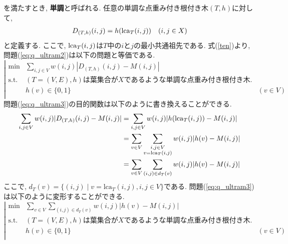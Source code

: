 \documentclass[a4paper,dvipdfmx]{jsarticle}
\begin{document}
を満たすとき, {\bf 単調}と呼ばれる. 任意の単調な点重み付き根付き木$(T,h)$に対して, 
\begin{align}
  D_{(T,h)}(i, j) = h({\rm lca}_T(i, j))\quad (i, j \in X) \label{ten}
\end{align}
と定義する. ここで, ${\rm lca}_T(i, j)$は$T$中の$i$と$j$の最小共通祖先である. 式(\ref{ten})より, 問題(\ref{eq:q_ultram2})は以下の問題と等価である. 
\begin{equation}\label{eq:q_ultram3}
\left|\begin{array}{rll}
\min & \displaystyle\sum_{i, j \in V} w(i,j)|D_{(T, h)}(i,j)- M(i,j)| & \\
\mbox{s.t.} &(T = (V, E),h)は葉集合がXであるような単調な点重み付き根付き木. & \\
& h(v) \in \{0,1\} &(v \in V) \\
\end{array}
\right.
\end{equation}
問題(\ref{eq:q_ultram3})の目的関数は以下のように書き換えることができる. 
\begin{align*}
  \sum_{i, j \in V} w(i,j)|D_{(T, h)}(i,j)- M(i,j)| &=  \sum_{i, j \in V} w(i,j)|h({\rm lca}_T(i, j)) - M(i,j)| \\
&=  \sum_{v \in V} \sum_{\substack{i,j \in V \\ v = {\rm lca}_T(i, j)}} w(i,j)|h(v) - M(i,j)| \\
&=  \sum_{v \in V} \sum_{(i,j) \in d_T(v)} w(i,j)|h(v) - M(i,j)| %
\end{align*}
ここで, $d_T(v) = \{(i, j) \mid v=\text{lca}_T(i, j), i, j \in V\}$である. 問題(\ref{eq:q_ultram3})は以下のように変形することができる. 
\begin{equation}\label{eq:q_ultram4}
\left|\begin{array}{lll}
\min & \displaystyle \sum_{v \in V} \sum_{(i,j) \in d_T(v)} w(i,j)|h(v) - M(i,j)|& \\
\mbox{s.t.} &(T = (V, E), h)は葉集合がXであるような単調な点重み付き根付き木. & \\
& h(v) \in \{0,1\} &(v \in V) \\
\end{array}
\right.
\end{equation}
\end{document}
